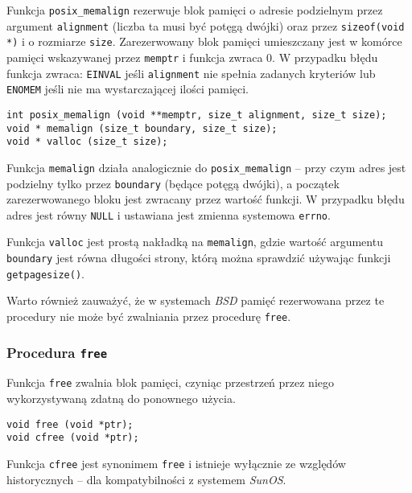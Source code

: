 \documentclass[12pt,a4paper,titlepage,twoside]{mwart}
\begin{document}
Funkcja \texttt{posix\_memalign} rezerwuje blok pamięci o adresie podzielnym
przez argument \texttt{alignment} (liczba ta musi być potęgą dwójki) oraz przez
\texttt{sizeof(void *)} i o rozmiarze \texttt{size}. Zarezerwowany blok pamięci
umieszczany jest w komórce pamięci wskazywanej przez \texttt{memptr} i funkcja
zwraca $0$. W przypadku błędu funkcja zwraca: \texttt{EINVAL} jeśli
\texttt{alignment} nie spełnia zadanych kryteriów lub \texttt{ENOMEM} jeśli nie
ma wystarczającej ilości pamięci.

\vspace{2ex}
\begin{lstlisting}[caption={Prototyp procedury \texttt{posix\_memalign}, \texttt{memalign} i \texttt{valloc}.},xleftmargin=0cm,xrightmargin=0cm]
int posix_memalign (void **memptr, size_t alignment, size_t size);
void * memalign (size_t boundary, size_t size);
void * valloc (size_t size);
\end{lstlisting}

Funkcja \texttt{memalign} działa analogicznie do \texttt{posix\_memalign} --
przy czym adres jest podzielny tylko przez \texttt{boundary} (będące potęgą
dwójki), a początek zarezerwowanego bloku jest zwracany przez wartość funkcji.
W przypadku błędu adres jest równy \texttt{NULL} i ustawiana jest zmienna
systemowa \texttt{errno}.

Funkcja \texttt{valloc} jest prostą nakładką na \texttt{memalign}, gdzie
wartość argumentu \texttt{boundary} jest równa długości strony, którą można
sprawdzić używając funkcji \texttt{getpagesize()}.

Warto również zauważyć, że w systemach \textit{BSD} pamięć rezerwowana przez te
procedury nie może być zwalniania przez procedurę \texttt{free}.

\subsubsection{Procedura \texttt{free}}

Funkcja \texttt{free} zwalnia blok pamięci, czyniąc przestrzeń przez niego
wykorzystywaną zdatną do ponownego użycia.

\vspace{2ex}
\begin{lstlisting}[caption={Prototyp procedury \texttt{free} i \texttt{cfree}.}]
void free (void *ptr);
void cfree (void *ptr);
\end{lstlisting}

Funkcja \texttt{cfree} jest synonimem \texttt{free} i istnieje wyłącznie ze
względów historycznych -- dla kompatybilności z systemem \textit{SunOS}.
\end{document}
